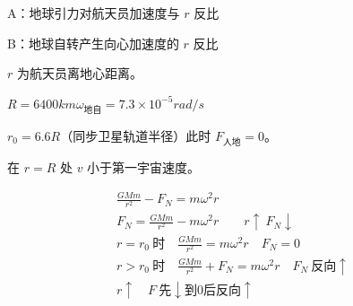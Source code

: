 
A：地球引力对航天员加速度与 $r$ 反比

B：地球自转产生向心加速度的 $r$ 反比%

$r$ 为航天员离地心距离。

$R=6400\unit{km}$\quad $\omega_{\text{地自}}=7.3\times10^{-5}\unit{rad/s}$

$r_0=6.6R$（同步卫星轨道半径）\quad 此时 $F_{\text{人地}}=0$。

在 $r=R$ 处 $v$ 小于第一宇宙速度。

\begin{gather*}
\frac{GMm}{r^2}-F_N=m\omega^2r\\
F_N=\frac{GMm}{r^2}-m\omega^2r\qquad r\uparrow\ F_N\downarrow\\
r=r_0\ \text{时}\quad \frac{GMm}{r^2}=m\omega^2r\quad F_N=0\\
r>r_0\ \text{时}\quad \frac{GMm}{r^2}+F_N=m\omega^2r\quad F_N\ \text{反向}\uparrow\\
r\uparrow\quad F\ \text{先}\downarrow\text{到0后反向}\uparrow
\end{gather*}
